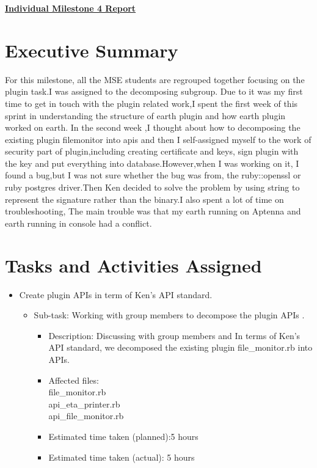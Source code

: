 \documentclass{article}
\begin{document}
\pagestyle{headings}

\begin{center}
{\LARGE\textbf{\underline{{Individual Milestone 4 Report}}}}
\end{center}

\section*{Executive Summary}
For this milestone, all the MSE students are regrouped together focusing on the plugin task.I was assigned to the decomposing subgroup. Due to it was my first time to get in touch with the plugin related work,I spent the first week of this sprint in understanding the structure of earth plugin and how earth plugin worked on earth.
In the second week ,I thought about how to decomposing the existing plugin filemonitor into apis and then I self-assigned myself to the work of security part of plugin,including creating certificate and keys, sign plugin with the key and put everything into database.However,when I was working on it, I found a bug,but I was not sure whether the bug was from, the ruby::openssl or ruby postgres driver.Then Ken decided to solve the problem by using string to represent the signature rather than the binary.I also spent a lot of time on troubleshooting, The main trouble was that my earth running on Aptenna and earth running in console had a conflict.

\section*{Tasks and Activities Assigned}

\begin{itemize}
	\item Create plugin APIs in term of Ken's API standard.
	     \begin{itemize}
			 \item  Sub-task: Working with group members to decompose the plugin APIs .
                         \begin{itemize}
					\item Description: Discussing with group members and In terms of Ken's   API standard, we decomposed the existing plugin 
                                        file\_monitor.rb into APIs.
                                        \item Affected files: \\
                                             file\_monitor.rb\\
                                             api\_eta\_printer.rb\\
                                             api\_file\_monitor.rb\\
					\item Estimated time taken (planned):5 hours
					\item Estimated time taken (actual): 5 hours
		       \end{itemize}              
                       \end{itemize}     
           \end{itemize}
\end{document}
